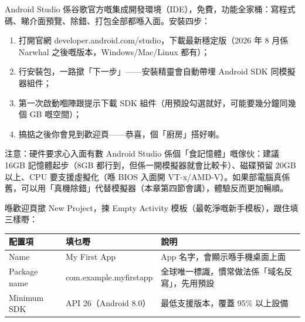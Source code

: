 


Android Studio 係谷歌官方嘅集成開發環境（IDE），免費，功能全家桶：寫程式碼、睇介面預覽、除錯、打包全部都喺入面。安裝四步：

\begin{enumerate}
  \item 打開官網 developer.android.com/studio，下載最新穩定版（2026 年 8 月係 Narwhal 之後嘅版本，Windows/Mac/Linux 都有）；
  \item 行安裝包，一路撳「下一步」——安裝精靈會自動帶埋 Android SDK 同模擬器組件；
  \item 第一次啟動嗰陣跟提示下載 SDK 組件（用預設勾選就好，可能要幾分鐘同幾個 GB 嘅空間）；
  \item 搞掂之後你會見到歡迎頁——恭喜，個「廚房」搭好喇。
\end{enumerate}

\begin{tcbwarn}{注意：硬件要求心入面有數}
Android Studio 係個「食記憶體」嘅傢伙：建議 16GB 記憶體起步（8GB 都行到，但係一開模擬器就會比較卡）、磁碟預留 20GB 以上、CPU 要支援虛擬化（喺 BIOS 入面開 VT-x/AMD-V）。如果部電腦真係舊，可以用「真機除錯」代替模擬器（本章第四節會講），體驗反而更加暢順。

\end{tcbwarn}


喺歡迎頁撳 New Project，揀 Empty Activity 模板（最乾淨嘅新手模板），跟住填三樣嘢：

\begin{center}
\begin{tabularx}{\linewidth}{|X|X|X|}
\hline
\textbf{配置項} & \textbf{填乜嘢} & \textbf{說明} \tabularnewline
\hline
Name & My First App & App 名字，會顯示喺手機桌面上面 \tabularnewline
Package name & com.example.myfirstapp & 全球唯一標識，慣常做法係「域名反寫」，先用預設 \tabularnewline
Minimum SDK & API 26（Android 8.0） & 最低支援版本，覆蓋 95\% 以上設備 \tabularnewline
\hline
\end{tabularx}
\end{center}


